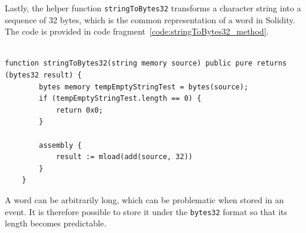 \documentclass[10pt]{article}
\begin{document}
Lastly, the helper function \texttt{stringToBytes32} transforms a character string into a sequence of 32 bytes, which is the common representation of a word in Solidity. The code is provided in code fragment~\ref{code:stringToBytes32_method}.


\begin{codefragment}[!h]
\begin{lstlisting}[language=Solidity]

function stringToBytes32(string memory source) public pure returns (bytes32 result) {
        bytes memory tempEmptyStringTest = bytes(source);
        if (tempEmptyStringTest.length == 0) {
            return 0x0;
        }

        assembly {
            result := mload(add(source, 32))
        }
    }

                        \end{lstlisting}
\caption{\texttt{stringToBytes32} method of \texttt{InsuranceLogic}}
    \label{code:stringToBytes32_method}
\end{codefragment}

A word can be arbitrarily long, which can be problematic when stored in an event. It is therefore possible to store it under the \texttt{bytes32} format so that its length becomes predictable.

\end{document}
